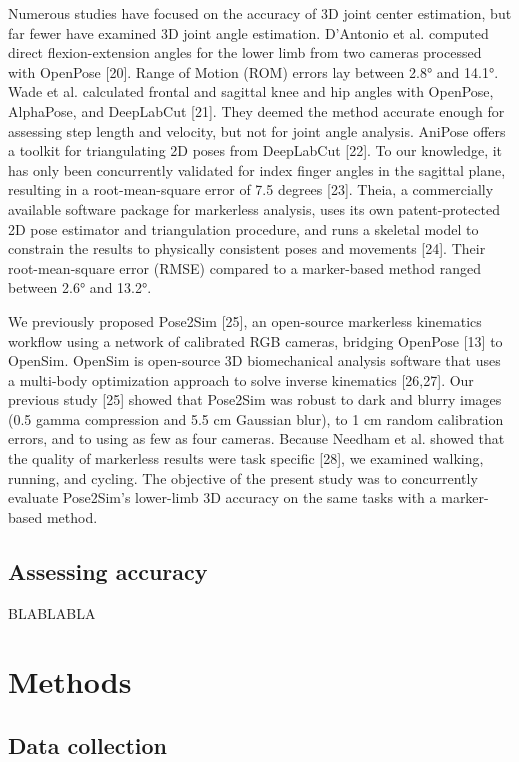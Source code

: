 Numerous studies have focused on the accuracy of 3D joint center estimation, but far fewer have examined 3D joint angle estimation. D’Antonio et al. computed direct flexion-extension angles for the lower limb from two cameras processed with OpenPose [20]. Range of Motion (ROM) errors lay between 2.8° and 14.1°. Wade et al. calculated frontal and sagittal knee and hip angles with OpenPose, AlphaPose, and DeepLabCut [21]. They deemed the method accurate enough for assessing step length and velocity, but not for joint angle analysis. AniPose offers a toolkit for triangulating 2D poses from DeepLabCut [22]. To our knowledge, it has only been concurrently validated for index finger angles in the sagittal plane, resulting in a root-mean-square error of 7.5 degrees [23]. Theia, a commercially available software package for markerless analysis, uses its own patent-protected 2D pose estimator and triangulation procedure, and runs a skeletal model to constrain the results to physically consistent poses and movements [24]. Their root-mean-square error (RMSE) compared to a marker-based method ranged between 2.6° and 13.2°.

We previously proposed Pose2Sim [25], an open-source markerless kinematics workflow using a network of calibrated RGB cameras, bridging OpenPose [13] to OpenSim. OpenSim is open-source 3D biomechanical analysis software that uses a multi-body optimization approach to solve inverse kinematics [26,27]. Our previous study [25] showed that Pose2Sim was robust to dark and blurry images (0.5 gamma compression and 5.5 cm Gaussian blur), to 1 cm random calibration errors, and to using as few as four cameras. Because Needham et al. showed that the quality of markerless results were task specific [28], we examined walking, running, and cycling. The objective of the present study was to concurrently evaluate Pose2Sim’s lower-limb 3D accuracy on the same tasks with a marker-based method.

\subsection{Assessing accuracy}

BLABLABLA


\section{Methods}\label{sec:accuracy_methods}
\subsection{Data collection}

